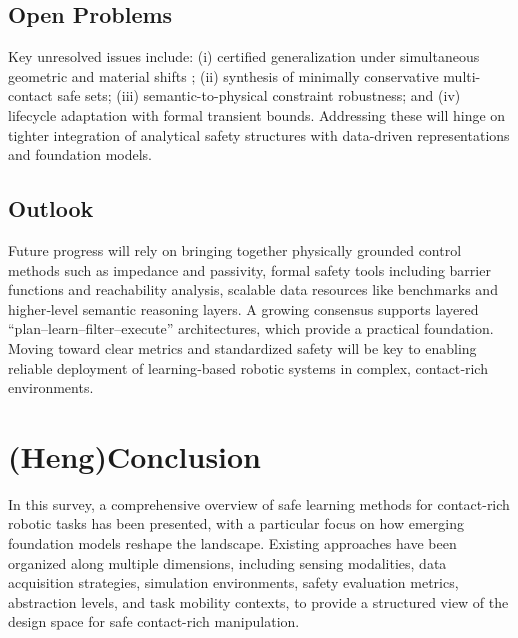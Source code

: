 \documentclass[Afour,sageh,times]{template/sagej}
\newcommand{\suggest}[1]{{\color{olive} (#1)}}
\begin{document}
    \subsection{Open Problems}
    Key unresolved issues include: (i) certified generalization under simultaneous geometric and
    material shifts \citep{das2025towards}; (ii) synthesis of minimally conservative multi-contact
    safe sets; (iii) semantic-to-physical constraint robustness; and (iv) lifecycle adaptation with
    formal transient bounds. Addressing these will hinge on tighter integration of analytical safety
    structures with data-driven representations and foundation models.
    \subsection{Outlook}
    Future progress will rely on bringing together physically grounded control methods such as impedance and passivity, formal safety tools including barrier functions and reachability analysis, scalable data resources like benchmarks and higher‑level semantic reasoning layers. A growing consensus supports layered “plan–learn–filter–execute” architectures, which provide a practical foundation. Moving toward clear metrics and standardized safety will be key to enabling reliable deployment of learning‑based robotic systems in complex, contact‑rich environments.

\section{\suggest{Heng}Conclusion}
In this survey, a comprehensive overview of safe learning methods for contact-rich robotic tasks has been presented, with a particular focus on how emerging foundation models reshape the landscape. Existing approaches have been organized along multiple dimensions, including sensing modalities, data acquisition strategies, simulation environments, safety evaluation metrics, abstraction levels, and task mobility contexts, to provide a structured view of the design space for safe contact-rich manipulation.
\end{document}

